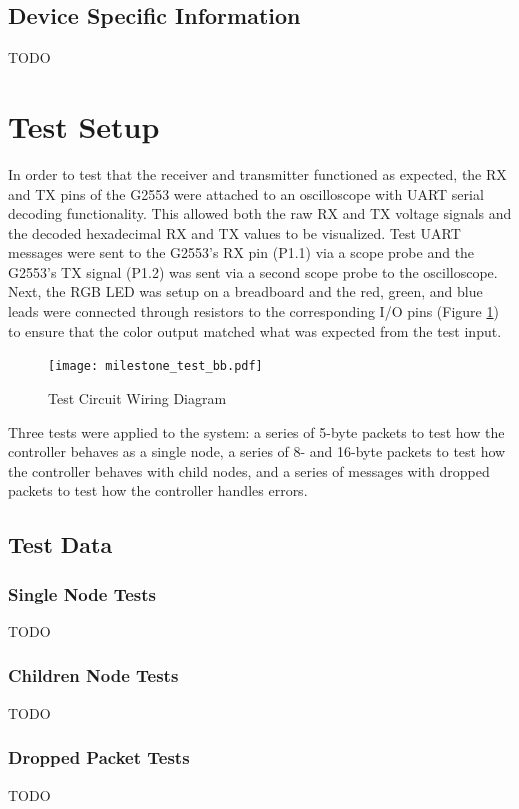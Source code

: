 \documentclass{hitec}
\begin{document}
\subsection{Device Specific Information}
TODO

\section{Test Setup}
In order to test that the receiver and transmitter functioned as expected, the RX and TX pins of the G2553 were attached to an oscilloscope with UART serial decoding functionality. This allowed both the raw RX and TX voltage signals and the decoded hexadecimal RX and TX values to be visualized. Test UART messages were sent to the G2553's RX pin (P1.1) via a scope probe and the G2553's TX signal (P1.2) was sent via a second scope probe to the oscilloscope. Next, the RGB LED was setup on a breadboard and the red, green, and blue leads were connected through resistors to the corresponding I/O pins (Figure \ref{fig:test_bb}) to ensure that the color output matched what was expected from the test input.

\begin{figure}[H]
    \centering
    \texttt{[image: milestone\_test\_bb.pdf]}
    \caption{Test Circuit Wiring Diagram}
    \label{fig:test_bb}
\end{figure}

Three tests were applied to the system: a series of 5-byte packets to test how the controller behaves as a single node, a series of 8- and 16-byte packets to test how the controller behaves with child nodes, and a series of messages with dropped packets to test how the controller handles errors.

\subsection{Test Data}
\subsubsection{Single Node Tests}
TODO

\subsubsection{Children Node Tests}
TODO

\subsubsection{Dropped Packet Tests}
TODO
\end{document}
